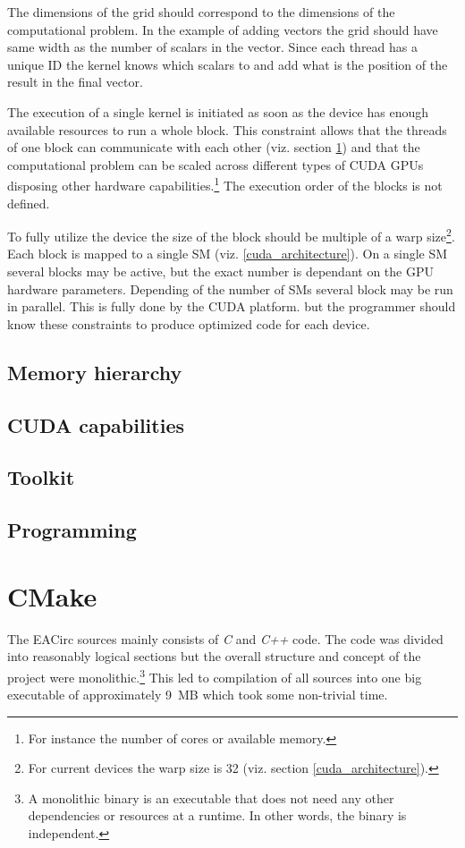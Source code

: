 \documentclass[12pt,oneside]{fithesis2}
\begin{document}
\noindent
The dimensions of the grid should correspond to the dimensions of the computational problem. In the example of adding vectors the grid should have same width as the number of scalars in the vector. Since each thread has a unique ID the kernel knows which scalars to and add what is the position of the result in the final vector.

The execution of a single kernel is initiated as soon as the device has enough available resources to run a whole block. This constraint allows that the threads of one block can communicate with each other (viz. section \ref{memory_hiearchy}) and that the computational problem can be scaled across different types of CUDA GPUs disposing other hardware capabilities.\footnote{For instance the number of cores or available memory.} The execution order of the blocks is not defined.

To fully utilize the device the size of the block should be multiple of a warp size\footnote{For current devices the warp size is 32 (viz. section \ref{cuda_architecture}).}. Each block is mapped to a single SM (viz. \ref{cuda_architecture}). On a single SM several blocks may be active, but the exact number is dependant on the GPU hardware parameters. Depending of the number of SMs several block may be run in parallel. This is fully done by the CUDA platform. but the programmer should know these constraints to produce optimized code for each device.

\section{Memory hierarchy} \label{memory_hiearchy}



\section{CUDA capabilities}
\section{Toolkit}
\section{Programming}





\chapter{CMake}
The EACirc sources mainly consists of \emph{C} and \emph{C++} code. The code was divided into reasonably logical sections but the overall structure and concept of the project were monolithic.\footnote{A monolithic binary is an executable that does not need any other dependencies or resources at a runtime. In other words, the binary is independent.} This led to compilation of all sources into one big executable of approximately 9~MB which took some non-trivial time.
\end{document}
